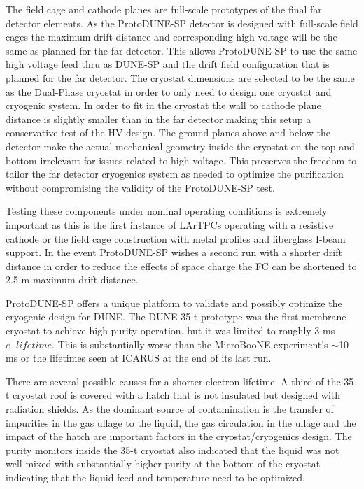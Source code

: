 The field cage and cathode planes are full-scale prototypes of the final far detector elements. As the ProtoDUNE-SP detector is designed with full-scale field cages the maximum drift distance and corresponding high voltage will be the same as planned for the far detector. This allows ProtoDUNE-SP to use the same high voltage feed thru as DUNE-SP and the drift field configuration that is planned for the far detector. The cryostat dimensions are selected to be the same as the Dual-Phase cryostat in order to only need to design one cryostat and cryogenic system. In order to fit in the cryostat the wall to cathode plane distance is slightly smaller than in the far detector making this setup a conservative test of the HV design. The ground planes above and below the detector make the actual mechanical geometry inside the cryostat on the top and bottom irrelevant for issues related to high voltage. This preserves the freedom to tailor the far detector cryogenics system as needed to optimize the purification without compromising the validity of the ProtoDUNE-SP test. 

Testing these components under nominal operating conditions is extremely important as this is the first instance of LArTPCs operating with a resistive cathode or the field cage construction with metal profiles and fiberglass I-beam support. In the event ProtoDUNE-SP wishes a second run with a shorter drift distance in order to reduce the effects of space charge the FC can be shortened to 2.5 m maximum drift distance.

ProtoDUNE-SP offers a unique platform to validate and possibly optimize the cryogenic design for DUNE. The DUNE 35-t prototype was the first membrane cryostat to achieve high purity operation, but it was limited to roughly 3 ms $e^-lifetime$. This is substantially worse than the MicroBooNE experiment's  $\sim$10 ms or the lifetimes seen at ICARUS at the end of its last run. 

There are several possible causes for a shorter electron lifetime.  A third of the 35-t cryostat roof is covered with a hatch that is not insulated but designed with radiation shields. As the dominant source of contamination is the transfer of impurities in the gas ullage to the liquid, the gas circulation in the ullage and the impact of the hatch are important factors in the cryostat/cryogenics design. The purity monitors inside the 35-t cryostat also indicated that the liquid was not well mixed with substantially higher purity at the bottom of the cryostat indicating that the liquid feed and temperature need to be optimized.  

